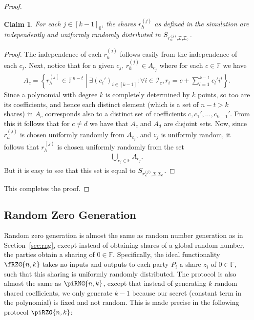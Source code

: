 \documentclass{article}
\newcommand{\set}[2]{\left\{ #1 \middle| #2 \right\}}
\newcommand{\seq}[1]{\left[#1\right]}
\newcommand{\seqZ}[1]{\left[#1\right]_0}
\newtheorem{claim}{Claim}
\theoremstyle{remark}
\newcommand{\F}{\mathbb{F}}
\begin{document}
\begin{proof}
	\begin{claim}
		For each $j \in \seqZ{k-1}$, the shares $r_h^{(j)}$ as defined in the
		simulation are independently and uniformly randomly distributed in
		$S_{r_c^{(j)}, \mathcal{I}, \mathcal{I}_c}$.
	\end{claim}

	\begin{proof}
		The independence of each $r_h^{(j)}$ follows easily from the
		independence of each $c_j$. Next, notice that for a given $c_j$,
		$r_h^{(j)} \in A_{c_j}$ where for each $c \in \F$ we have
		\begin{align*}
			A_c
			=
			\set{%
				r_h^{(j)} \in \F^{n-t}
			}{%
				\exists {(c_i')}_{i \in \seq{k-1}}:
				\forall i \in \mathcal{I}_c,
				r_i = c + \sum_{l=1}^{k-1} c_l' i^l
			}.
		\end{align*}
		Since a polynomial with degree $k$ is completely determined by $k$
		points, so too are its coefficients, and hence each distinct element
		(which is a set of $n-t > k$ shares) in $A_c$ corresponds also to a
		distinct set of coefficients $c, c_1', \ldots, c_{k-1}'$. From this it
		follows that for $c \ne d$ we have that $A_c$ and $A_d$ are disjoint
		sets. Now, since $r_h^{(j)}$ is chosen uniformly randomly from
		$A_{c_j}$, and $c_j$ is uniformly random, it follows that $r_h^{(j)}$
		is chosen uniformly randomly from the set
		\begin{align*}
			\bigcup_{c_j \in \F} A_{c_j}.
		\end{align*}
		But it is easy to see that this set is equal to
		$S_{r_c^{(j)}, \mathcal{I}, \mathcal{I}_c}$.
	\end{proof}

	This completes the proof.
\end{proof}

\subsection{Random Zero Generation}\label{sec:rzg}

Random zero generation is almost the same as random number generation as in
Section~\ref{sec:rng}, except instead of obtaining shares of a global random
number, the parties obtain a sharing of $0 \in \F$. Specifically, the ideal
functionality $\fRZG{n,k}$ takes no inputs and outputs to each party $P_i$ a
share $z_i$ of $0 \in \F$, such that this sharing is uniformly randomly
distributed. The protocol is also almost the same as $\piRNG{n,k}$, except that
instead of generating $k$ random shared coefficients, we only generate $k-1$
because our secret (constant term in the polynomial) is fixed and not random.
This is made precise in the following protocol $\piRZG{n,k}$:
\end{document}
